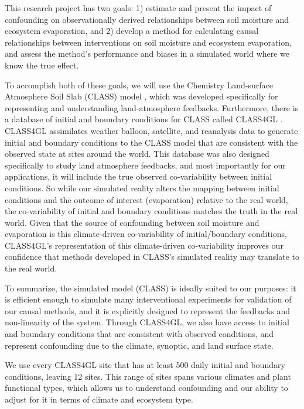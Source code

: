 This research project has two goals: 1) estimate and present the
impact of confounding on observationally derived relationships between
soil moisture and ecosystem evaporation, and 2) develop a method for
calculating causal relationships between interventions on soil
moisture and ecosystem evaporation, and assess the method's
performance and biases in a simulated world where we know the true
effect.

To accomplish both of these goals, we will use the Chemistry
Land-surface Atmosphere Soil Slab (CLASS) model
\cite[\url{https://classmodel.github.io/}, ]{de2015atmospheric,},
which was developed specifically for representing and understanding
land-atmosphere feedbacks. Furthermore, there is a database of initial
and boundary conditions for CLASS called CLASS4GL
\cite[\url{https://class4gl.eu/}]{wouters-class4gl-2019}. CLASS4GL
assimilates weather balloon, satellite, and reanalysis data to
generate initial and boundary conditions to the CLASS model that are
consistent with the observed state at sites around the world. This
database was also designed specifically to study land atmosphere
feedbacks, and most importantly for our applications, it will include
the true observed co-variability between initial conditions. So while
our simulated reality alters the mapping between initial conditions
and the outcome of interest (evaporation) relative to the real world,
the co-variability of initial and boundary conditions matches the
truth in the real world. Given that the source of confounding between
soil moisture and evaporation is this climate-driven co-variability of
initial/boundary conditions, CLASS4GL's representation of this
climate-driven co-variability improves our confidence that methods
developed in CLASS's simulated reality may translate to the real
world.

To summarize, the simulated model (CLASS) is ideally suited to our
purposes: it is efficient enough to simulate many interventional
experiments for validation of our causal methods, and it is explicitly
designed to represent the feedbacks and non-linearity of the
system. Through CLASS4GL, we also have access to initial and boundary
conditions that are consistent with observed conditions, and represent
confounding due to the climate, synoptic, and land surface state.

We use every CLASS4GL site that has at least 500 daily initial and
boundary conditions, leaving 12 sites. This range of sites spans
various climates and plant functional types, which allows us to
understand confounding and our ability to adjust for it in terms of
climate and ecosystem type.

